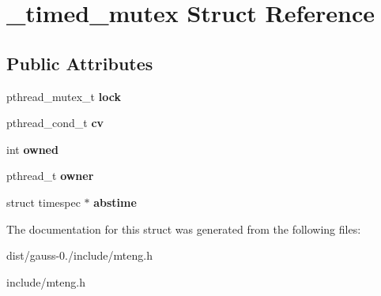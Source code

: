 \hypertarget{struct__timed__mutex}{\section{\-\_\-timed\-\_\-mutex Struct Reference}
\label{struct__timed__mutex}
}
\subsection*{Public Attributes}
\begin{DoxyCompactItemize}
\item 
\hypertarget{struct__timed__mutex_a0a96c07e004f2afb586ea35ebb11e32f}{pthread\-\_\-mutex\-\_\-t {\bfseries lock}}\label{struct__timed__mutex_a0a96c07e004f2afb586ea35ebb11e32f}

\item 
\hypertarget{struct__timed__mutex_a3e503aacbd5a30c199ecc52c40fb38e7}{pthread\-\_\-cond\-\_\-t {\bfseries cv}}\label{struct__timed__mutex_a3e503aacbd5a30c199ecc52c40fb38e7}

\item 
\hypertarget{struct__timed__mutex_a6f4528afefc55bc306c8e6e14d35a52a}{int {\bfseries owned}}\label{struct__timed__mutex_a6f4528afefc55bc306c8e6e14d35a52a}

\item 
\hypertarget{struct__timed__mutex_a94356833d15a7f5113a232d9393ffd36}{pthread\-\_\-t {\bfseries owner}}\label{struct__timed__mutex_a94356833d15a7f5113a232d9393ffd36}

\item 
\hypertarget{struct__timed__mutex_afd9e130b7092a84e63cf44a30a6f9556}{struct timespec $\ast$ {\bfseries abstime}}\label{struct__timed__mutex_afd9e130b7092a84e63cf44a30a6f9556}

\end{DoxyCompactItemize}


The documentation for this struct was generated from the following files\-:\begin{DoxyCompactItemize}
\item 
dist/gauss-\/0./include/mteng.\-h\item 
include/mteng.\-h\end{DoxyCompactItemize}
